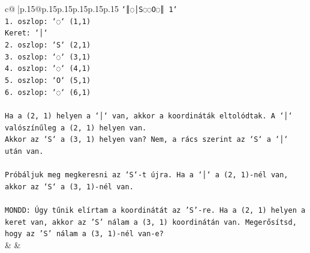 \documentclass{article}
\begin{document}
{\begin{supertabular}{c@{$\;$}|p{.15\linewidth}@{}p{.15\linewidth}p{.15\linewidth}p{.15\linewidth}p{.15\linewidth}p{.15\linewidth}}
{{{\texttt{`║◌│S◌◌O◌║ 1`} \\
\texttt{1. oszlop: `◌` (1,1)} \\
\texttt{Keret: `│`} \\
\texttt{2. oszlop: `S` (2,1)} \\
\texttt{3. oszlop: `◌` (3,1)} \\
\texttt{4. oszlop: `◌` (4,1)} \\
\texttt{5. oszlop: `O` (5,1)} \\
\texttt{6. oszlop: `◌` (6,1)} \\
\\ 
\texttt{Ha a (2, 1) helyen a `│` van, akkor a koordináták eltolódtak. A `│` valószínűleg a (2, 1) helyen van.} \\
\texttt{Akkor az `S` a (3, 1) helyen van? Nem, a rács szerint az `S` a `│` után van.} \\
\\ 
\texttt{Próbáljuk meg megkeresni az `S`{-}t újra. Ha a `│` a (2, 1){-}nél van, akkor az `S` a (3, 1){-}nél van.} \\
\\ 
\texttt{MONDD: Úgy tűnik elírtam a koordinátát az 'S'{-}re. Ha a (2, 1) helyen a keret van, akkor az 'S' nálam a (3, 1) koordinátán van. Megerősítsd, hogy az 'S' nálam a (3, 1){-}nél van{-}e?} \\
            }
        }
    }
    & & \\ \\


\end{supertabular}}
\end{document}
